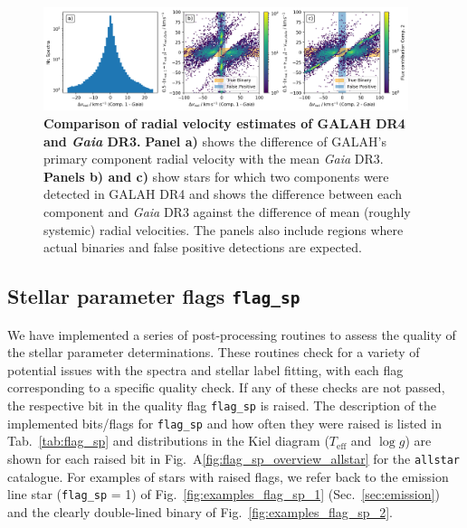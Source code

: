 \documentclass[
  journal=pasa,
  manuscript=research-paper, %
  year=2024,
  volume=37
]{cup-journal}
\newcommand{\Teff}{$T_\mathrm{eff}$\xspace}
\newcommand{\logg}{$\log g$\xspace}
\begin{document}
\begin{figure}[ht]
\centering
\includegraphics[width=0.95\textwidth]{figures/vrad_comparison_comp1_comp2_gaiadr3.png}
\caption{\textbf{Comparison of radial velocity estimates of GALAH DR4 and \textit{Gaia} DR3.} \textbf{Panel a)} shows the difference of GALAH's primary component radial velocity with the mean \textit{Gaia} DR3. \textbf{Panels b) and c)} show stars for which two components were detected in GALAH DR4 and shows the difference between each component and \textit{Gaia} DR3 against the difference of mean (roughly systemic) radial velocities. The panels also include regions where actual binaries and false positive detections are expected.}
\label{fig:vrad_comparison_comp1_comp2_gaiadr3}
\end{figure}

\subsection{Stellar parameter flags \texttt{flag\_sp}}
\label{sec:flag_sp}

We have implemented a series of post-processing routines to assess the quality of the stellar parameter determinations. These routines check for a variety of potential issues with the spectra and stellar label fitting, with each flag corresponding to a specific quality check. If any of these checks are not passed, the respective bit in the quality flag \texttt{flag\_sp} is raised. The description of the implemented bits/flags for \texttt{flag\_sp} and how often they were raised is listed in Tab.~\ref{tab:flag_sp} and distributions in the Kiel diagram (\Teff and \logg) are shown for each raised bit in Fig.~A\ref{fig:flag_sp_overview_allstar} for the \texttt{allstar} catalogue. For examples of stars with raised flags, we refer back to the emission line star (\texttt{flag\_sp} = 1) of Fig.~\ref{fig:examples_flag_sp_1} (Sec.~\ref{sec:emission}) and the clearly double-lined binary of Fig.~\ref{fig:examples_flag_sp_2}.
\end{document}
